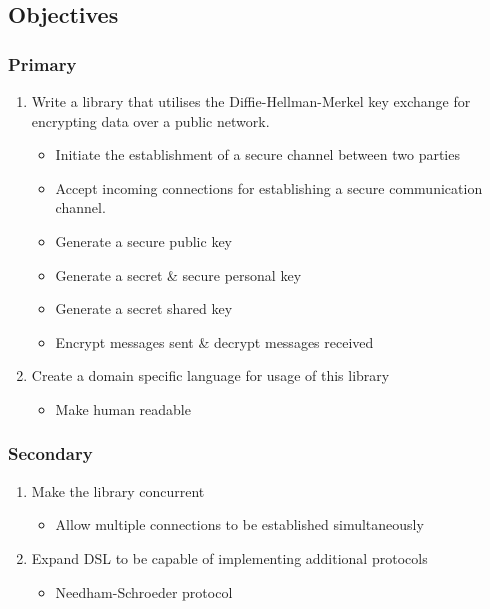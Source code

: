 
\subsection{Objectives}
\label{sec:objectives}
\subsubsection{Primary}
\begin{enumerate}
    \item Write a library that utilises the Diffie-Hellman-Merkel key exchange for encrypting data 
over a public network.
        \begin{itemize}
            \item Initiate the establishment of a secure channel between two parties 
            \item Accept incoming connections for establishing a secure communication channel. 
            \item Generate a secure public key 
            \item Generate a secret \& secure personal key 
            \item Generate a secret shared key 
            \item Encrypt messages sent \& decrypt messages received
        \end{itemize}
    \item Create a domain specific language for usage of this library
        \begin{itemize}
            \item Make human readable
        \end{itemize}
\end{enumerate}
\subsubsection{Secondary}
\begin{enumerate}
    \item Make the library concurrent
        \begin{itemize}
            \item Allow multiple connections to be established simultaneously
        \end{itemize}
    \item Expand DSL to be capable of implementing additional protocols
        \begin{itemize}
            \item Needham-Schroeder protocol 
        \end{itemize}
\end{enumerate}

